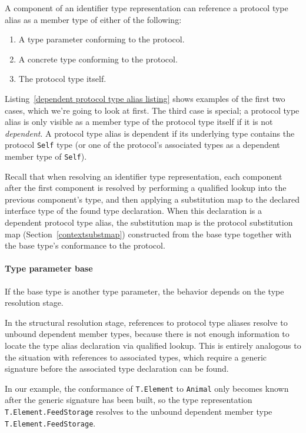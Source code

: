 \documentclass[../generics]{subfiles}
\begin{document}
A component of an identifier type representation can reference a protocol type alias as a member type of either of the following:
\begin{enumerate}
\item A type parameter conforming to the protocol.
\item A concrete type conforming to the protocol.
\item The protocol type itself.
\end{enumerate}
Listing~\ref{dependent protocol type alias listing} shows examples of the first two cases, which we're going to look at first. The third case is special; a protocol type alias is only visible as a member type of the protocol type itself if it is not \emph{dependent}. A protocol type alias is dependent if its underlying type contains the protocol \texttt{Self} type (or one of the protocol's associated types as a dependent member type of \texttt{Self}).

Recall that when resolving an identifier type representation, each component after the first component is resolved by performing a qualified lookup into the previous component's type, and then applying a substitution map to the declared interface type of the found type declaration. When this declaration is a dependent protocol type alias, the substitution map is the protocol substitution map (Section~\ref{contextsubstmap}) constructed from the base type together with the base type's conformance to the protocol.

\paragraph{Type parameter base}
If the base type is another type parameter, the behavior depends on the type resolution stage.

In the structural resolution stage, references to protocol type aliases resolve to unbound dependent member types, because there is not enough information to locate the type alias declaration via qualified lookup. This is entirely analogous to the situation with references to associated types, which require a generic signature before the associated type declaration can be found.

In our example, the conformance of \texttt{T.Element} to \texttt{Animal} only becomes known after the generic signature has been built, so the type representation \texttt{T.Element.FeedStorage} resolves to the unbound dependent member type \texttt{T.Element.FeedStorage}.
\end{document}
